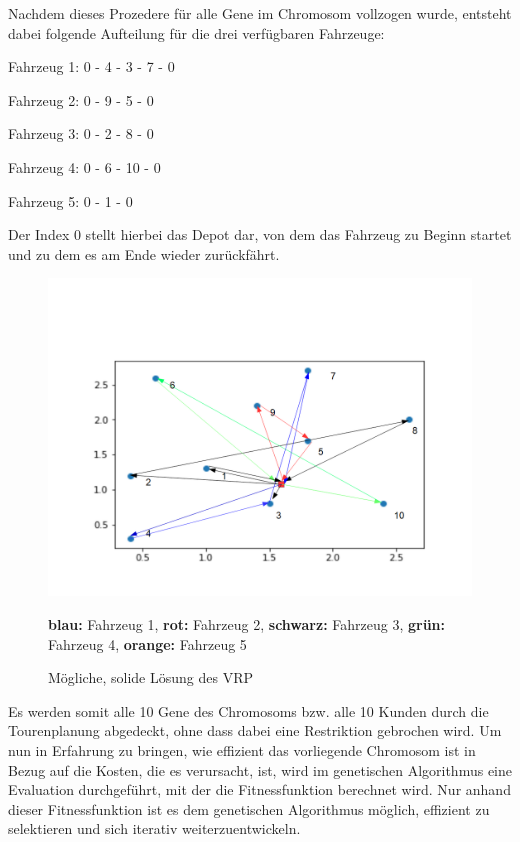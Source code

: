\documentclass[a4paper,12pt,parskip,bibtotoc,liststotoc]{article}
\begin{document}
Nachdem dieses Prozedere für alle Gene im Chromosom vollzogen wurde, entsteht dabei folgende Aufteilung für die drei verfügbaren Fahrzeuge: 

\begin{center}

Fahrzeug 1: 0 - 4 - 3 - 7 - 0

Fahrzeug 2: 0 - 9 - 5 - 0

Fahrzeug 3: 0 - 2 - 8 - 0

Fahrzeug 4: 0 - 6 - 10 - 0

Fahrzeug 5: 0 - 1 - 0

\end{center}


Der Index 0 stellt hierbei das Depot dar, von dem das Fahrzeug zu Beginn startet und zu dem es am Ende wieder zurückfährt.
 



\begin{figure}[h!]
  \begin{center}
    \includegraphics[width=150mm]{vrppp2.png}
    \caption{Mögliche, solide Lösung des VRP}  \label{Typen}
    {\footnotesize \textbf{blau:} Fahrzeug 1, \textbf{rot:} Fahrzeug 2, \textbf{schwarz:} Fahrzeug 3, \textbf{grün:} Fahrzeug 4, \textbf{orange:} Fahrzeug 5}
  \end{center}
\end{figure}

Es werden somit alle 10 Gene des Chromosoms bzw. alle 10 Kunden durch die Tourenplanung abgedeckt, ohne dass dabei eine Restriktion gebrochen wird.
Um nun in Erfahrung zu bringen, wie effizient das vorliegende Chromosom ist in Bezug auf die Kosten, die es verursacht, ist, wird im genetischen Algorithmus eine Evaluation durchgeführt, mit der die Fitnessfunktion berechnet wird. 
Nur anhand dieser Fitnessfunktion ist es dem genetischen Algorithmus möglich, effizient zu selektieren und sich iterativ weiterzuentwickeln.
\end{document}
